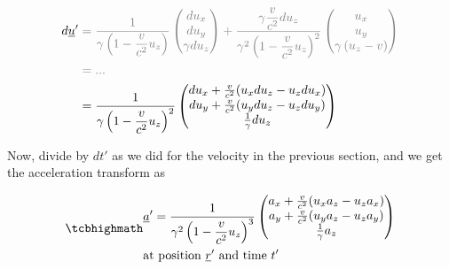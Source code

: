 \begin{equation}
	\begin{aligned}
		d\underline{u}{'} & \color{gray} = \dfrac{1}{{\gamma}\left(1-\dfrac{v}{{c}^2} {u_z}\right) }
		\begin{pmatrix}
			d{u_x}          \\
			d{u_y}          \\
			{\gamma} d{u_z} \\
		\end{pmatrix}
		+ \dfrac{{\gamma} \dfrac{v}{{c}^2} d{u_z}}{{\gamma}^2\left(1-\dfrac{v}{{c}^2} {u_z}\right)^2 }
		\begin{pmatrix}
			{u_x}                              \\
			{u_y}                              \\
			{\gamma} \left( {u_z}- {v} \right) \\
		\end{pmatrix}                                                           \\
		                  & \color{gray} = ...
		\\
		                  & = \dfrac{1}{{\gamma}\left(1-\dfrac{v}{{c}^2} {u_z}\right)^2 }
		\begin{pmatrix}
			d{u_x} + \frac{v}{{c}^2}( {u_x} d{u_z}-{u_z} d{u_x}) \\
			d{u_y} + \frac{v}{{c}^2}( {u_y} d{u_z}-{u_z} d{u_y}) \\
			\frac{1}{{\gamma}} d{u_z}                            \\
		\end{pmatrix}
	\end{aligned}
\end{equation}

Now, divide by ${dt{'}}$ as we did for the velocity in the previous section, and we get the acceleration transform as

\begin{equation}
	\mhl{
		\begin{aligned}
			 & \underline{a}{'} = \dfrac{1}{{\gamma}^2\left(1-\dfrac{v}{{c}^2} {u_z}\right)^3 }
			\begin{pmatrix}
				{{a}_{x}} + \frac{v}{{c}^2}({u_x} {{a}_{z}}-{u_z} {{a}_{x}}) \\
				{{a}_{y}} + \frac{v}{{c}^2}({u_y} {{a}_{z}}-{u_z} {{a}_{y}}) \\
				\frac{1}{{\gamma}}{{a}_{z}}
			\end{pmatrix}
			\\
			 & \text{at position ${\underline{r}{'}}$ and time ${t{'}}$ }
		\end{aligned}
	}
	\label{eq: acceleration transform}
\end{equation}

